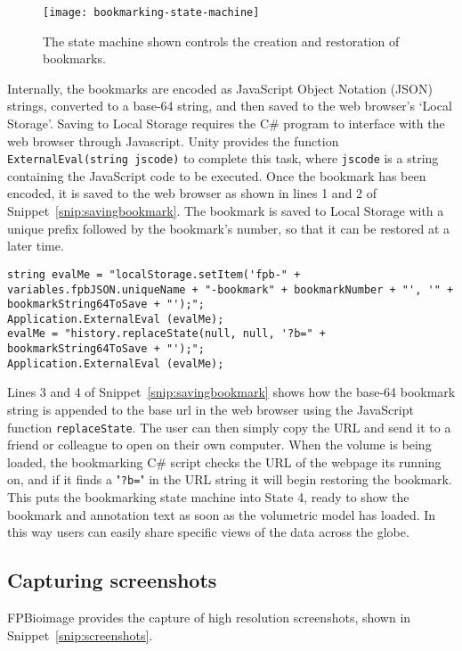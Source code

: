 \begin{figure}[htbp!]
\centering
\texttt{[image: bookmarking-state-machine]}
\caption[FPBioimage: Bookmark creation and restoration is controlled by a state machine]{The state machine shown controls the creation and restoration of bookmarks. }
\label{fig:bookmarking-state-machine}
\end{figure}

Internally, the bookmarks are encoded as JavaScript Object Notation (JSON) strings, converted to a base-64 string, and then saved to the web browser's `Local Storage'.
Saving to Local Storage requires the C\# program to interface with the web browser through Javascript.
Unity provides the function \texttt{ExternalEval(string jscode)} to complete this task, where \texttt{jscode} is a string containing the JavaScript code to be executed.
Once the bookmark has been encoded, it is saved to the web browser as shown in lines 1 and 2 of Snippet~\ref{snip:savingbookmark}.
The bookmark is saved to Local Storage with a unique prefix followed by the bookmark's number, so that it can be restored at a later time.

\begin{lstlisting}[language={[Sharp]c}, label={snip:savingbookmark}, caption={C\#-JavaScript interface code for interacting with the browser's local storage to save and share bookmarks.}]
string evalMe = "localStorage.setItem('fpb-" + variables.fpbJSON.uniqueName + "-bookmark" + bookmarkNumber + "', '" + bookmarkString64ToSave + "');";
Application.ExternalEval (evalMe);
evalMe = "history.replaceState(null, null, '?b=" + bookmarkString64ToSave + "');";
Application.ExternalEval (evalMe);
\end{lstlisting}

Lines 3 and 4 of Snippet~\ref{snip:savingbookmark} shows how the base-64 bookmark string is appended to the base url in the web browser using the JavaScript function \texttt{replaceState}.
The user can then simply copy the URL and send it to a friend or colleague to open on their own computer.
When the volume is being loaded, the bookmarking C\# script checks the URL of the webpage its running on, and if it finds a "\texttt{?b=}" in the URL string it will begin restoring the bookmark.
This puts the bookmarking state machine into State 4, ready to show the bookmark and annotation text as soon as the volumetric model has loaded.
In this way users can easily share specific views of the data across the globe.

\subsection{Capturing screenshots}
FPBioimage provides the capture of high resolution screenshots, shown in Snippet~\ref{snip:screenshots}.

